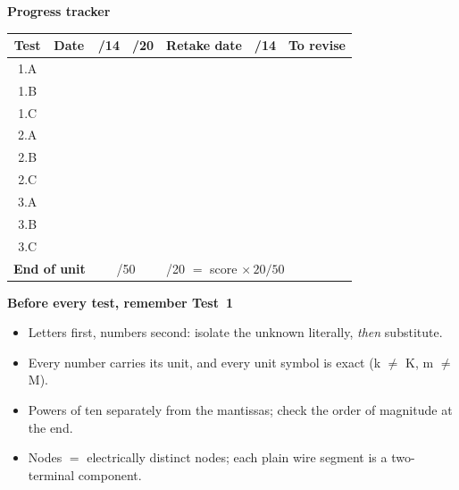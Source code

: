 \documentclass{ibetest}
\renewcommand{\arraystretch}{1.35}
\begin{document}
\newpage
\testheader
\vspace{8mm}
{\sffamily\bfseries\Large Progress tracker}\par\vspace{4mm}
\begin{center}
\renewcommand{\arraystretch}{2.1}
\begin{tabular}{|c|p{22mm}|c|c|p{22mm}|c|p{42mm}|}
\hline
\textbf{Test} & \textbf{Date} & \textbf{/14} & \textbf{/20} & \textbf{Retake date} &
\textbf{/14} & \textbf{To revise}\\ \hline
1.A & & & & & & \\ \hline
1.B & & & & & & \\ \hline
1.C & & & & & & \\ \hline
2.A & & & & & & \\ \hline
2.B & & & & & & \\ \hline
2.C & & & & & & \\ \hline
3.A & & & & & & \\ \hline
3.B & & & & & & \\ \hline
3.C & & & & & & \\ \hline\hline
\multicolumn{2}{|l|}{\textbf{End of unit}} & \multicolumn{2}{c|}{\hspace{6mm}/50} &
\multicolumn{3}{l|}{\quad /20 $=$ score $\times\,20/50$} \\ \hline
\end{tabular}
\end{center}
\vspace{6mm}
{\sffamily\bfseries Before every test, remember Test~1}
\begin{itemize}[leftmargin=7mm, itemsep=2pt]
  \item Letters first, numbers second: isolate the unknown literally, \emph{then} substitute.
  \item Every number carries its unit, and every unit symbol is exact (k $\neq$ K, m $\neq$ M).
  \item Powers of ten separately from the mantissas; check the order of magnitude at the end.
  \item Nodes $=$ electrically distinct nodes; each plain wire segment is a two-terminal
        component.
\end{itemize}
\end{document}
